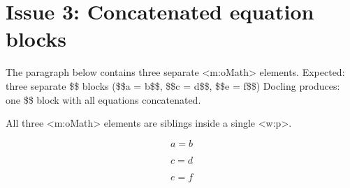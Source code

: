 \documentclass[11pt,a4paper]{article}
\begin{document}
\section{Issue 3: Concatenated equation blocks}

The paragraph below contains three separate <m:oMath> elements.
Expected: three separate \$\$ blocks (\$\$a = b\$\$, \$\$c = d\$\$, \$\$e = f\$\$)
Docling produces: one \$\$ block with all equations concatenated.

All three <m:oMath> elements are siblings inside a single <w:p>.

$$a=b$$

$$c=d$$

$$e=f$$
\end{document}
